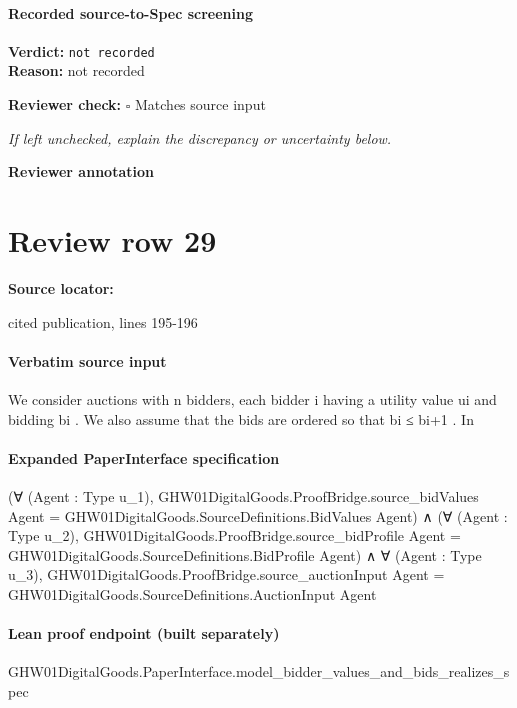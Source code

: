 \documentclass[10pt]{article}
\newcommand{\reviewerbox}{%
  \par\noindent\fbox{\parbox{0.96\linewidth}{\rule{0pt}{0.38in}}}\par
}
\newcommand{\reviewmatch}[1]{%
  \par\noindent\textbf{Reviewer check:} $\square$\; #1\par
  \noindent\emph{If left unchecked, explain the discrepancy or uncertainty below.}\par
}
\begin{document}
\paragraph{Recorded source-to-Spec screening}
\textbf{Verdict:} \texttt{not recorded}
\\
\textbf{Reason:} not recorded
\reviewmatch{Matches source input}
\noindent\textbf{Reviewer annotation}\par
\reviewerbox
\clearpage
\hypertarget{source-claim-48593168ec07b0d9}{}
\section*{Review row 29}
\textbf{Source locator:} {\footnotesize\raggedright cited publication, lines 195-\allowbreak{}196\par}
\paragraph{Verbatim source input}
\begin{ReviewVerbatim}
We consider auctions with n bidders, each bidder i
having a utility value ui and bidding bi . We also assume that the bids are ordered so that bi ≤ bi+1 . In
\end{ReviewVerbatim}


\paragraph{Expanded PaperInterface specification}
\begin{ReviewVerbatim}
(∀ (Agent : Type u_1),
    GHW01DigitalGoods.ProofBridge.source_bidValues Agent = GHW01DigitalGoods.SourceDefinitions.BidValues Agent) ∧
  (∀ (Agent : Type u_2),
      GHW01DigitalGoods.ProofBridge.source_bidProfile Agent = GHW01DigitalGoods.SourceDefinitions.BidProfile Agent) ∧
    ∀ (Agent : Type u_3),
      GHW01DigitalGoods.ProofBridge.source_auctionInput Agent = GHW01DigitalGoods.SourceDefinitions.AuctionInput Agent
\end{ReviewVerbatim}

\paragraph{Lean proof endpoint (built separately)}\begin{ReviewVerbatim}
GHW01DigitalGoods.PaperInterface.model_bidder_values_and_bids_realizes_spec
\end{ReviewVerbatim}
\end{document}
